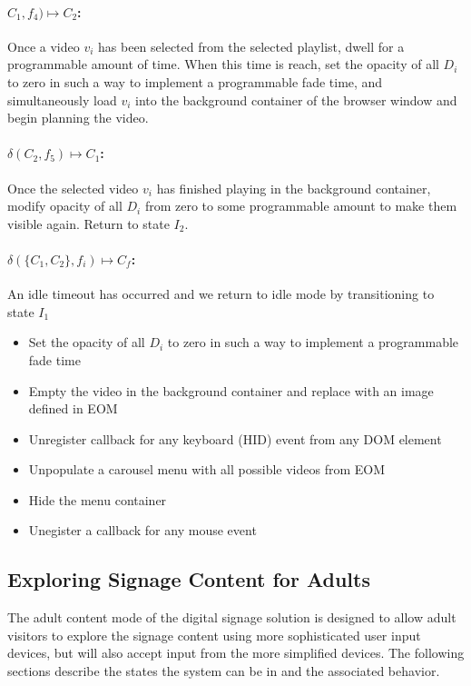 \documentclass[10pt]{article}
\begin{document}
\paragraph{$C_{1}, f_{4}) \mapsto C_{2}$:}

Once a video $v_{i}$ has been selected from the selected playlist, dwell for a programmable amount of time. When this time is reach, set the opacity of all $D_{i}$ to zero in such a way to implement a programmable fade time, and simultaneously load $v_{i}$ into the background container of the browser window and begin planning the video. 

\paragraph{$\delta(C_{2}, f_{5}) \mapsto C_{1}$:}

Once the selected video $v_{i}$ has finished playing in the background container, modify opacity of all $D_{i}$ from zero to some programmable amount to make them visible again. Return to state $I_{2}$.

\paragraph{$\delta(\{C_{1}, C_{2}\}, f_{i}) \mapsto C_{f}$:} 

An idle timeout has occurred and we return to idle mode by transitioning to state $I_{1}$

\begin{itemize}
	\item Set the opacity of all $D_{i}$ to zero in such a way to implement a programmable fade time
	\item Empty the video in the background container and replace with an image defined in EOM
	\item Unregister callback for any keyboard (HID) event from any DOM element
	\item Unpopulate a carousel menu with all possible videos from EOM
	\item Hide the menu container
	\item Unegister a callback for any mouse event 
\end{itemize}

\subsection{Exploring Signage Content for Adults}

The adult content mode of the digital signage solution is designed to allow adult visitors to explore the signage content using more sophisticated user input devices, but will also accept input from the more simplified devices. The following sections describe the states the system can be in and the associated behavior.
\end{document}
